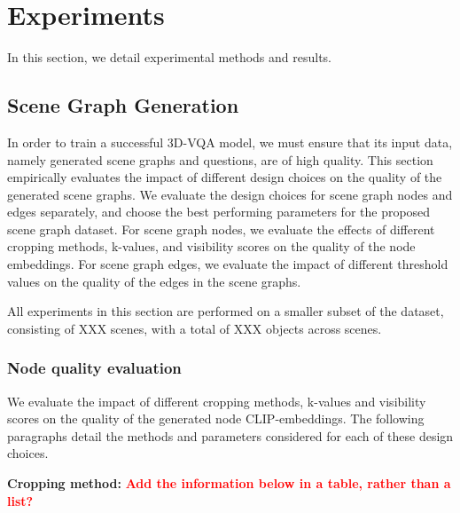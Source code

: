 %
\newpage
\chapter{Experiments}

In this section, we detail experimental methods and results.


\section{Scene Graph Generation}

In order to train a successful 3D-VQA model, we must ensure that its input data, namely generated scene graphs and questions, are of high quality. This section empirically evaluates the impact of different design choices on the quality of the generated scene graphs. We evaluate the design choices for scene graph nodes and edges separately, and choose the best performing parameters for the proposed scene graph dataset. For scene graph nodes, we evaluate the effects of different cropping methods, k-values, and visibility scores on the quality of the node embeddings. For scene graph edges, we evaluate the impact of different threshold values on the quality of the edges in the scene graphs.

All experiments in this section are performed on a smaller subset of the dataset, consisting of XXX scenes, with a total of XXX objects across scenes.

\subsection{Node quality evaluation}
We evaluate the impact of different cropping methods, k-values and visibility scores on the quality of the generated node CLIP-embeddings. The following paragraphs detail the methods and parameters considered for each of these design choices.

\bigskip \noindent
\textbf{Cropping method:}
\textcolor{red}{\textbf{Add the information below in a table, rather than a list?}}

